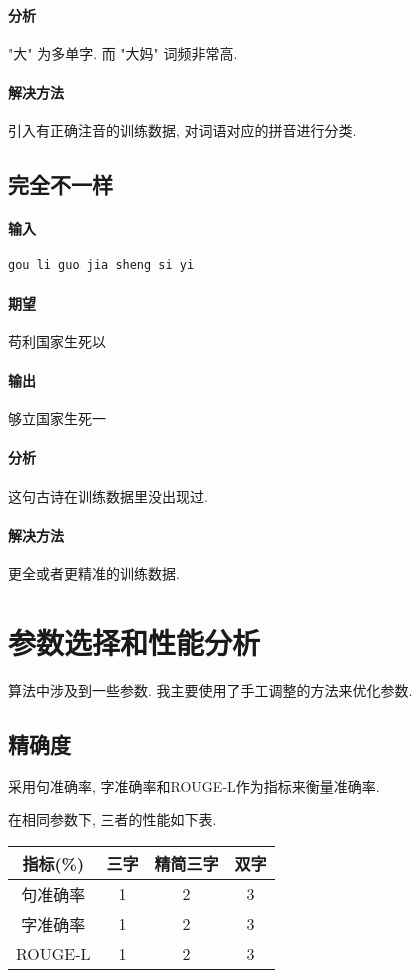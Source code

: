 \paragraph{分析} "大" 为多单字. 而 "大妈" 词频非常高. 

\paragraph{解决方法} 引入有正确注音的训练数据, 对词语对应的拼音进行分类.

\subsection{完全不一样}
\paragraph{输入} \texttt{gou li guo jia sheng si yi}

\paragraph{期望} 苟利国家生死以

\paragraph{输出} 够立国家生死一 

\paragraph{分析} 这句古诗在训练数据里没出现过.

\paragraph{解决方法} 更全或者更精准的训练数据.

\section{参数选择和性能分析}
算法中涉及到一些参数. 我主要使用了手工调整的方法来优化参数. 

\subsection{精确度}
采用句准确率, 字准确率和ROUGE-L作为指标来衡量准确率.

在相同参数下, 三者的性能如下表.

\begin{tabular}{|c|ccc|}
	\hline
	指标(\%) & 三字 & 精简三字 & 双字 \tabularnewline \hline
	句准确率 & 1 & 2 & 3 \tabularnewline 
	字准确率 & 1 & 2 & 3 \tabularnewline
	ROUGE-L  & 1 & 2 & 3 \tabularnewline \hline
\end{tabular}

